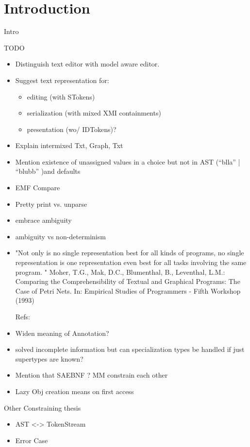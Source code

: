 \chapter{Introduction}
\label{cha:introduction}
Intro

TODO
\begin{itemize}
	\item Distinguish text editor with model aware editor.
	\item Suggest text representation for: 
	\begin{itemize}
		\item editing (with STokens)
		\item serialization (with mixed XMI containments)
		\item presentation (wo/ IDTokens)?
	\end{itemize}
	
	\item Explain intermixed Txt, Graph, Txt
	\item Mention existence of unassigned values in a choice but not in AST (``blla'' | ``blubb'' )and defaults
	\item EMF Compare
	\item Pretty print vs. unparse

	\item embrace ambiguity
	\item ambiguity vs non-determinism

	\item "Not only is no single representation best for all kinds of programs, no single representation is one representation even best for all tasks involving the same  program. " Moher, T.G., Mak, D.C., Blumenthal, B., Leventhal, L.M.: Comparing the Comprehensibility of Textual and Graphical Programs: The Case of Petri Nets. In: Empirical Studies of Programmers - Fifth Workshop (1993)
	

Refs:
	\item Widen meaning of Annotation?
	\item solved incomplete information but can specialization types be handled if just supertypes are known? 
	\item Mention that SAEBNF ? MM constrain each other
	\item Lazy Obj creation means on first access
	\end{itemize}

Other Constraining thesis
\begin{itemize}
	\item AST <-> TokenStream
	\item Error Case
\end{itemize}

